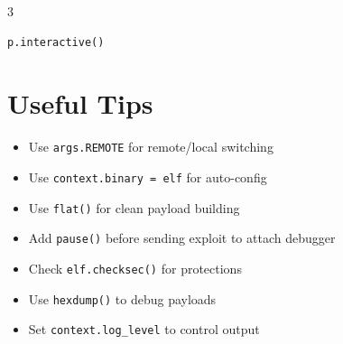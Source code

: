 \documentclass[10pt,landscape,a4paper]{article}
\begin{document}
\begin{multicols}{3}
\begin{lstlisting}[language=Python]
p.interactive()
\end{lstlisting}

\section*{Useful Tips}
\begin{itemize}[leftmargin=*,noitemsep,topsep=0pt]
    \item Use \texttt{args.REMOTE} for remote/local switching
    \item Use \texttt{context.binary = elf} for auto-config
    \item Use \texttt{flat()} for clean payload building
    \item Add \texttt{pause()} before sending exploit to attach debugger
    \item Check \texttt{elf.checksec()} for protections
    \item Use \texttt{hexdump()} to debug payloads
    \item Set \texttt{context.log\_level} to control output
\end{itemize}

\vfill
\columnbreak

\end{multicols}
\end{document}
